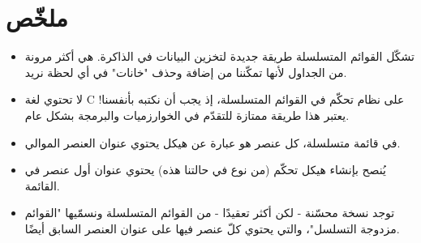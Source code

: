 \section*{ملخّص}

\begin{itemize}
	\item تشكّل القوائم المتسلسلة طريقة جديدة لتخزين البيانات في الذاكرة. هي أكثر مرونة من الجداول لأنها تمكّننا من إضافة وحذف "خانات" في أي لحظة نريد.
	\item لا تحتوي لغة
	\textenglish{C}
	على نظام تحكّم في القوائم المتسلسلة، إذ يجب أن نكتبه بأنفسنا! يعتبر هذا طريقة ممتازة للتقدّم في الخوارزميات والبرمجة بشكل عام.
	\item في قائمة متسلسلة، كل عنصر هو عبارة عن هيكل يحتوي عنوان العنصر الموالي.
	\item يُنصح بإنشاء هيكل تحكّم (من نوع
	في حالتنا هذه) يحتوي عنوان أول عنصر في القائمة.
	\item توجد نسخة محسّنة - لكن أكثر تعقيدًا - من القوائم المتسلسلة ونسمّيها "القوائم مزدوجة التسلسل"، والتي يحتوي كلّ عنصر فيها على عنوان العنصر السابق أيضًا.
\end{itemize}
